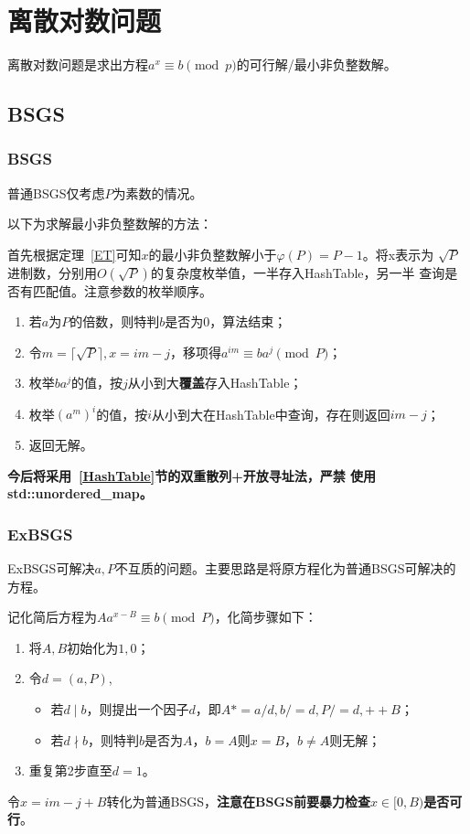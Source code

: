 \section{离散对数问题}
离散对数问题是求出方程$a^x\equiv b\pmod{p}$的可行解/最小非负整数解。
\subsection{BSGS}\label{BSGS}
\subsubsection{BSGS}
普通BSGS仅考虑$P$为素数的情况。

以下为求解最小非负整数解的方法：

首先根据定理~\ref{ET}可知$x$的最小非负整数解小于$\varphi(P)=P-1$。将x表示为
$\sqrt{P}$进制数，分别用$O(\sqrt{P})$的复杂度枚举值，一半存入HashTable，另一半
查询是否有匹配值。注意参数的枚举顺序。

\begin{enumerate}
    \item 若$a$为$P$的倍数，则特判$b$是否为$0$，算法结束；
    \item 令$m=\lceil\sqrt{P}\rceil,x=im-j$，移项得$a^{im}\equiv ba^j\pmod{P}$；
    \item 枚举$ba^j$的值，按$j$从小到大{\bfseries 覆盖}存入HashTable；
    \item 枚举$(a^m)^i$的值，按$i$从小到大在HashTable中查询，存在则返回$im-j$；
    \item 返回无解。
\end{enumerate}

{\bfseries 今后将采用~\ref{HashTable}节的双重散列+开放寻址法，严禁
使用std::unordered\_map。}
\subsubsection{ExBSGS}
ExBSGS可解决$a,P$不互质的问题。主要思路是将原方程化为普通BSGS可解决的方程。

记化简后方程为$Aa^{x-B}\equiv b\pmod{P}$，化简步骤如下：
\begin{enumerate}
    \item 将$A,B$初始化为$1,0$；
    \item 令$d=(a,P)$,
    \begin{itemize}
        \item 若$d\mid b$，则提出一个因子$d$，即$A*=a/d,b/=d,P/=d,++B$；
        \item 若$d\nmid b$，则特判$b$是否为$A$，$b=A$则$x=B$，$b\neq A$则无解；
    \end{itemize}
    \item 重复第2步直至$d=1$。
\end{enumerate}
令$x=im-j+B$转化为普通BSGS，{\bfseries 注意在BSGS前要暴力检查$x\in[0,B)$是否可行}。


